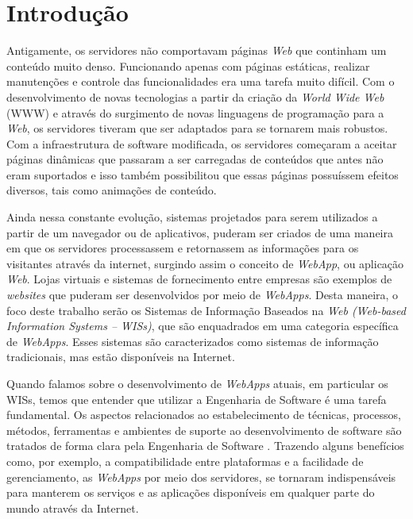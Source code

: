 
\section{Introdução}
\label{sec-intro}


Antigamente, os servidores não comportavam páginas \textit{Web} que continham um conteúdo muito denso. Funcionando apenas com páginas estáticas, realizar manutenções e controle das funcionalidades era uma tarefa muito difícil. Com o desenvolvimento de novas tecnologias a partir da criação da \textit{World Wide Web} (WWW) e através do surgimento de novas linguagens de programação para a \textit{Web}, os servidores tiveram que ser adaptados para se tornarem mais robustos. Com a infraestrutura de software modificada, os servidores começaram a aceitar páginas dinâmicas que passaram a ser carregadas de conteúdos que antes não eram suportados e isso também possibilitou que essas páginas possuíssem efeitos diversos, tais como animações de conteúdo.

Ainda nessa constante evolução, sistemas projetados para serem utilizados a partir de um navegador ou de aplicativos, puderam ser criados de uma maneira em que os servidores processassem e retornassem as informações para os visitantes através da internet, surgindo assim o conceito de \textit{WebApp}, ou aplicação \textit{Web}. Lojas virtuais e sistemas de fornecimento entre empresas são exemplos de \textit{websites} que puderam ser desenvolvidos por meio de \textit{WebApps}. Desta maneira, o foco deste trabalho serão os Sistemas de Informação Baseados na \textit{Web (Web-based Information Systems – WISs)}, que são enquadrados em uma categoria específica de \textit{WebApps}. Esses sistemas são caracterizados como sistemas de informação tradicionais, mas estão disponíveis na Internet.

Quando falamos sobre o desenvolvimento de \textit{WebApps} atuais, em particular os WISs, temos que entender que utilizar a Engenharia de Software é uma tarefa fundamental. Os aspectos relacionados ao estabelecimento de técnicas, processos, métodos, ferramentas e ambientes de suporte ao desenvolvimento de software são tratados de forma clara pela Engenharia de Software \cite{falbo:es14}. Trazendo alguns benefícios como, por exemplo, a compatibilidade entre plataformas e a facilidade de gerenciamento, as \textit{WebApps} por meio dos servidores, se tornaram indispensáveis para manterem os serviços e as aplicações disponíveis em qualquer parte do mundo através da Internet.

